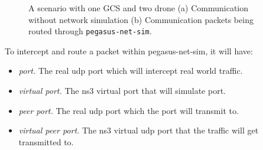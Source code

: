 \begin{figure} 
	\centering
	\caption[Example of \texttt{pegasus-net-sim} intercepting packets.]{\small 
		A scenario with one GCS and two drone (a) Communication without network simulation (b) Communication packets being routed through \texttt{pegasus-net-sim}.}
	
	\label{fig:pegasus-net-sim-simulation-example}
\end{figure}

To intercept and route a packet within pegasus-net-sim, it will have:
\begin{itemize}
	\item \textit{port.} The real udp port which will intercept real world traffic.
	\item \textit{virtual port.} The ns3 virtual port that will simulate port.
	\item \textit{peer port.} The real udp port which the port will transmit to.
	\item \textit{virtual peer port.} The ns3 virtual udp port that the traffic will get transmitted to.
\end{itemize}


